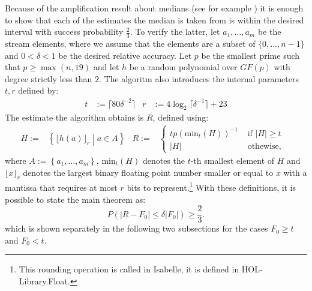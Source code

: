 \documentclass[11pt,a4paper]{article}
\newcommand{\size}[1]{\lvert#1\rvert}
\begin{document}
Because of the amplification result about medians (see for example \cite[]{alon1999}) it is enough to show that each of the estimates the median is taken from is within the desired interval with success probability $\frac{2}{3}$.
To verify the latter, let $a_1, \ldots, a_m$ be the stream elements, where we assume that the elements are a subset of $\{0,\ldots,n-1\}$ and $0 < \delta < 1$ be the desired relative accuracy.
Let $p$ be the smallest prime such that $p \geq \max (n,19)$ and let $h$ be a random polynomial over $GF(p)$ with degree strictly less than $2$.
The algoritm also introduces the internal parameters $t, r$ defined by:
\begin{align*}
    t & := \lceil 80\delta^{-2} \rceil &
    r & := 4 \log_2 \lceil \delta^{-1} \rceil + 23
\end{align*}
The estimate the algorithm obtains is $R$, defined using:
\begin{align*}
    H := & \left\{ \lfloor h(a) \rfloor_r \middle \vert a \in A \right\} &
    R := & \begin{cases} t p \left(\mathrm{min}_t (H) \right)^{-1} & \textrm{ if } \size{H} \geq t \\
    \size{H} & \textrm{ othewise,} \end{cases} &
\end{align*}
where $A := \left\{ a_1, \ldots, a_m \right\}$, $\mathrm{min}_t(H)$ denotes the $t$-th smallest element of $H$ and $\lfloor x \rfloor_r$ denotes the largest binary floating point number smaller or equal to $x$ with a mantissa that requires at most $r$ bits to represent.\footnote{This rounding operation is called  in Isabelle, it is defined in HOL\nobreakdash-Library.Float.}
With these definitions, it is possible to state the main theorem as:
\[
    P(\size{R - F_0} \leq \delta \size{F_0}) \geq \frac{2}{3} \textrm{.}  
\]
which is shown separately in the following two subsections for the cases $F_0 \geq t$ and $F_0 < t$.
\end{document}
